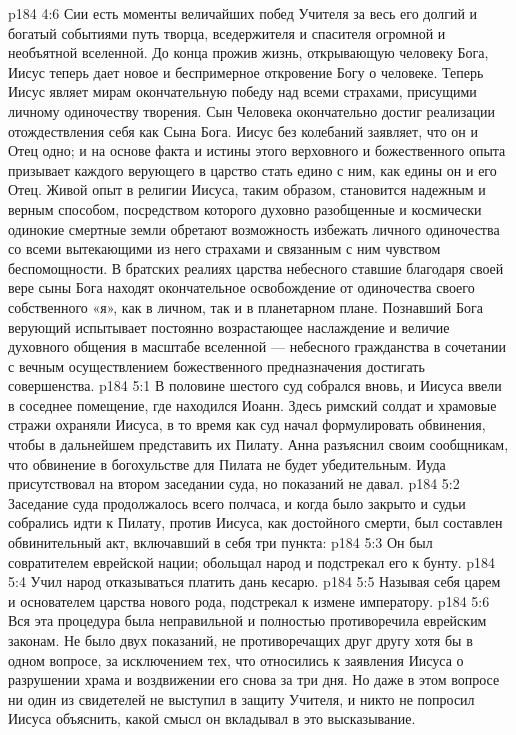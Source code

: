 \vs p184 4:6 Сии есть моменты величайших побед Учителя за весь его долгий и богатый событиями путь творца, вседержителя и спасителя огромной и необъятной вселенной. До конца прожив жизнь, открывающую человеку Бога, Иисус теперь дает новое и беспримерное откровение Богу о человеке. Теперь Иисус являет мирам окончательную победу над всеми страхами, присущими личному одиночеству творения. Сын Человека окончательно достиг реализации отождествления себя как Сына Бога. Иисус без колебаний заявляет, что он и Отец одно; и на основе факта и истины этого верховного и божественного опыта призывает каждого верующего в царство стать едино с ним, как едины он и его Отец. Живой опыт в религии Иисуса, таким образом, становится надежным и верным способом, посредством которого духовно разобщенные и космически одинокие смертные земли обретают возможность избежать личного одиночества со всеми вытекающими из него страхами и связанным с ним чувством беспомощности. В братских реалиях царства небесного ставшие благодаря своей вере сыны Бога находят окончательное освобождение от одиночества своего собственного «я», как в личном, так и в планетарном плане. Познавший Бога верующий испытывает постоянно возрастающее наслаждение и величие духовного общения в масштабе вселенной --- небесного гражданства в сочетании с вечным осуществлением божественного предназначения достигать совершенства.
\vs p184 5:1 В половине шестого суд собрался вновь, и Иисуса ввели в соседнее помещение, где находился Иоанн. Здесь римский солдат и храмовые стражи охраняли Иисуса, в то время как суд начал формулировать обвинения, чтобы в дальнейшем представить их Пилату. Анна разъяснил своим сообщникам, что обвинение в богохульстве для Пилата не будет убедительным. Иуда присутствовал на втором заседании суда, но показаний не давал.
\vs p184 5:2 Заседание суда продолжалось всего полчаса, и когда было закрыто и судьи собрались идти к Пилату, против Иисуса, как достойного смерти, был составлен обвинительный акт, включавший в себя три пункта:
\vs p184 5:3 \bibnobreakspace Он был совратителем еврейской нации; обольщал народ и подстрекал его к бунту.
\vs p184 5:4 \bibnobreakspace Учил народ отказываться платить дань кесарю.
\vs p184 5:5 \bibnobreakspace Называя себя царем и основателем царства нового рода, подстрекал к измене императору.
\vs p184 5:6 \pc Вся эта процедура была неправильной и полностью противоречила еврейским законам. Не было двух показаний, не противоречащих друг другу хотя бы в одном вопросе, за исключением тех, что относились к заявления Иисуса о разрушении храма и воздвижении его снова за три дня. Но даже в этом вопросе ни один из свидетелей не выступил в защиту Учителя, и никто не попросил Иисуса объяснить, какой смысл он вкладывал в это высказывание.
